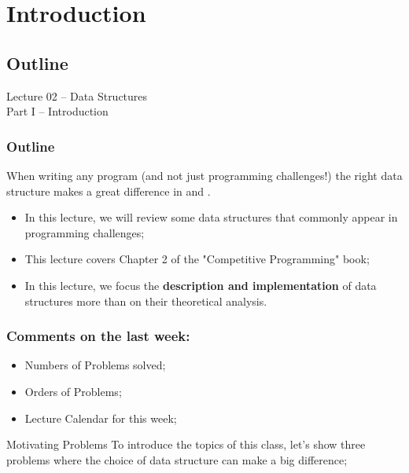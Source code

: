 \section{Introduction}
\subsection{Outline}

\begin{frame}
  \begin{center}
    {\large Lecture 02 -- Data Structures\\Part I -- Introduction}\\
  \end{center}
\end{frame}

\begin{frame}
  \frametitle{Outline}

  When writing any program (and not just programming challenges!) the right data structure makes a great difference in  and .\bigskip

  \begin{itemize}
    \item In this lecture, we will review some data structures that commonly appear in programming challenges;\medskip

    \item This lecture covers Chapter 2 of the "Competitive Programming" book;\medskip

    \item In this lecture, we focus the {\bf description and implementation} of data structures more than on their theoretical analysis.
  \end{itemize}
\end{frame}

\begin{frame}
  \frametitle{Comments on the last week:}

  \begin{itemize}
    \item Numbers of Problems solved;\medskip

    \item Orders of Problems;\medskip

    \item Lecture Calendar for this week;
  \end{itemize}
  \vfill

  \begin{block}{Motivating Problems}
    To introduce the topics of this class, let's show three problems where the choice of data structure can make a big difference;
  \end{block}
\end{frame}

